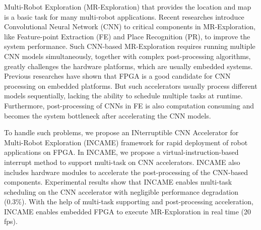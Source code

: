 
Multi-Robot Exploration (MR-Exploration) that provides the location and map is a basic task for many multi-robot applications. Recent researches introduce Convolutional Neural Network (CNN) to critical components in MR-Exploration, like Feature-point Extraction (FE) and Place Recognition (PR), to improve the system performance. Such CNN-based MR-Exploration requires running multiple CNN models simultaneously, together with complex post-processing algorithms, greatly challenges the hardware platforms, which are usually embedded systems.
Previous researches have shown that FPGA is a good candidate for CNN processing on embedded platforms. But such accelerators usually process different models sequentially, lacking the ability to schedule multiple tasks at runtime. Furthermore, post-processing of CNNs in FE is also computation consuming and becomes the system bottleneck after accelerating the CNN models.

To handle such problems, we propose an INterruptible CNN Accelerator for Multi-Robot Exploration (INCAME) framework for rapid deployment of robot applications on FPGA. In INCAME, we propose a virtual-instruction-based interrupt method to support multi-task on CNN accelerators. INCAME also includes hardware modules to accelerate the post-processing of the CNN-based components.
Experimental results show that INCAME enables multi-task scheduling on the CNN accelerator with negligible performance degradation (0.3\%). With the help of multi-task supporting and post-processing acceleration, INCAME enables embedded FPGA to execute MR-Exploration in real time (20 fps).

